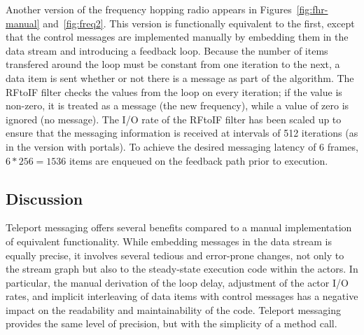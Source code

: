 Another version of the frequency hopping radio appears in
Figures~\ref{fig:fhr-manual} and~\ref{fig:freq2}.  This version is
functionally equivalent to the first, except that the control messages
are implemented manually by embedding them in the data stream and
introducing a feedback loop.  Because the number of items transfered
around the loop must be constant from one iteration to the next, a
data item is sent whether or not there is a message as part of the
algorithm.  The RFtoIF filter checks the values from the loop on every
iteration; if the value is non-zero, it is treated as a message (the
new frequency), while a value of zero is ignored (no message).  The
I/O rate of the RFtoIF filter has been scaled up to ensure that the
messaging information is received at intervals of 512 iterations (as
in the version with portals).  To achieve the desired messaging
latency of 6 frames, $6*256 = 1536$ items are enqueued on the feedback
path prior to execution.




\subsection{Discussion}

Teleport messaging offers several benefits compared to a manual
implementation of equivalent functionality.  While embedding messages
in the data stream is equally precise, it involves several tedious
and error-prone changes, not only to the stream graph but also to the
steady-state execution code within the actors.  In particular, the
manual derivation of the loop delay, adjustment of the actor I/O
rates, and implicit interleaving of data items with control messages
has a negative impact on the readability and maintainability of the
code.  Teleport messaging provides the same level of precision, but
with the simplicity of a method call.

